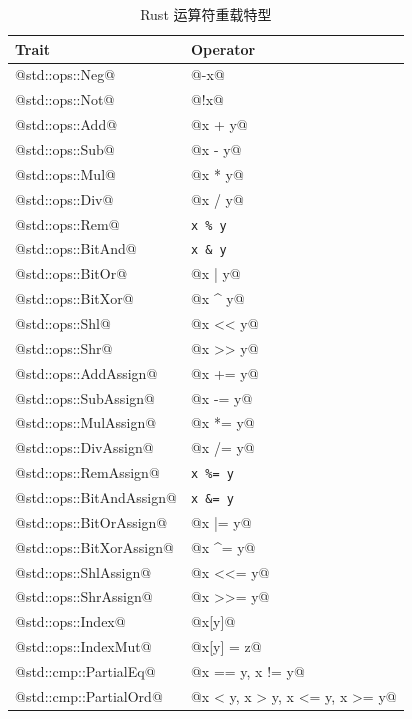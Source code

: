 \begin{table}[ht]
	\centering
	\begin{tabular}{|l|l|}
		\hline
		\textbf{Trait}           & \textbf{Operator}              \\
		\hline
		@std::ops::Neg@          & @-x@                           \\
		@std::ops::Not@          & @!x@                           \\
		\hline
		@std::ops::Add@          & @x + y@                        \\
		@std::ops::Sub@          & @x - y@                        \\
		@std::ops::Mul@          & @x * y@                        \\
		@std::ops::Div@          & @x / y@                        \\
		@std::ops::Rem@          & \verb|x % y|                   \\
		\hline
		@std::ops::BitAnd@       & \verb|x & y|                   \\
		@std::ops::BitOr@        & @x | y@                        \\
		@std::ops::BitXor@       & @x ^ y@                        \\
		@std::ops::Shl@          & @x << y@                       \\
		@std::ops::Shr@          & @x >> y@                       \\
		\hline
		@std::ops::AddAssign@    & @x += y@                       \\
		@std::ops::SubAssign@    & @x -= y@                       \\
		@std::ops::MulAssign@    & @x *= y@                       \\
		@std::ops::DivAssign@    & @x /= y@                       \\
		@std::ops::RemAssign@    & \verb|x %= y|                  \\
		@std::ops::BitAndAssign@ & \verb|x &= y|                  \\
		@std::ops::BitOrAssign@  & @x |= y@                       \\
		@std::ops::BitXorAssign@ & @x ^= y@                       \\
		@std::ops::ShlAssign@    & @x <<= y@                      \\
		@std::ops::ShrAssign@    & @x >>= y@                      \\
		\hline
		@std::ops::Index@        & @x[y]@                         \\
		@std::ops::IndexMut@     & @x[y] = z@                     \\
		\hline
		@std::cmp::PartialEq@    & @x == y, x != y@               \\
		@std::cmp::PartialOrd@   & @x < y, x > y, x <= y, x >= y@ \\
		\hline
	\end{tabular}
	\caption{Rust 运算符重载特型}
\end{table}

